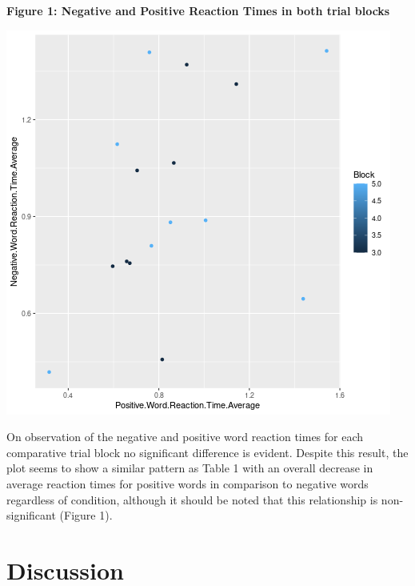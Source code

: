 \documentclass[11pt]{article}
\begin{document}
\noindent
\textbf{Figure 1: Negative and Positive Reaction Times in both trial blocks}
\begin{center}
\includegraphics[width=.9\linewidth]{plot.png}
\end{center}

On observation of the negative and positive word reaction times for each comparative trial block 
no significant difference is evident. Despite this result, the plot seems to show a similar pattern as Table 1 with an overall decrease in average reaction times for positive words in comparison to negative words regardless of condition, although it should be noted that this relationship is non-significant (Figure 1). 

\section{Discussion}
\label{sec:org1c8c48f}
\end{document}
